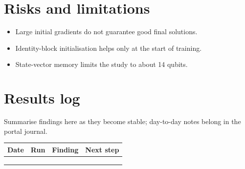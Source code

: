 \documentclass[11pt,a4paper]{article}
\begin{document}
\section{Risks and limitations}
\begin{itemize}
  \item Large initial gradients do not guarantee good final solutions.
  \item Identity-block initialisation helps only at the start of training.
  \item State-vector memory limits the study to about 14 qubits.
\end{itemize}

\section{Results log}
\label{sec:log}
Summarise findings here as they become stable; day-to-day notes belong in the portal journal.

\begin{table}[h]
\centering\small
\begin{tabularx}{\linewidth}{@{}l l >{\raggedright}X >{\raggedright\arraybackslash}X@{}}
\toprule
Date & Run & Finding & Next step \\
\midrule
 & & & \\
 & & & \\
 & & & \\
\bottomrule
\end{tabularx}
\end{table}



\end{document}
